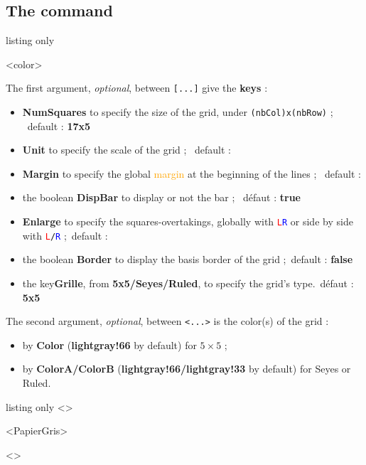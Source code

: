 \documentclass[a4paper]{article}
\newcommand\Cle[1]{{\bfseries\sffamily\textlangle #1\textrangle}}
\begin{document}
\subsection{The command}

\begin{PresentationCode}{listing only}

\DispGrid[keys]<color>
\end{PresentationCode}

The first argument, \textit{optional}, between \texttt{[...]} give the \Cle{keys} :

\begin{itemize}
	\item \Cle{NumSquares} to specify the size of the grid, under \texttt{(nbCol)x(nbRow)} ; \hfill~default : \Cle{17x5}
	\item \Cle{Unit} to specify the scale of the grid ; \hfill~default : \Cle{1}
	\item \Cle{Margin} to specify the global \textcolor{orange}{margin} at the beginning of the lines ; \hfill~default : \Cle{0}
	\item the boolean \Cle{DispBar} to display or not the bar ; \hfill~défaut : \Cle{true}
	\item \Cle{Enlarge} to specify the squares-overtakings, globally with \texttt{\textcolor{red}{L}\textcolor{blue}{R}} or side by side with \texttt{\textcolor{red}{L}/\textcolor{blue}{R}} ;\hfill~default : \Cle{0}
	\item the boolean \Cle{Border} to display the basis border of the grid ;\hfill~default : \Cle{false}
	\item the key\Cle{Grille}, from \Cle{5x5/Seyes/Ruled}, to specify the grid's type.\hfill~défaut : \Cle{5x5}
\end{itemize}

The second argument, \textit{optional}, between \texttt{<...>} is the color(s) of the grid :

\begin{itemize}
	\item by \Cle{Color} (\Cle{lightgray!66} by default) for $5\times5$  ;
	\item by \Cle{ColorA/ColorB} (\Cle{lightgray!66/lightgray!33} by default) for Seyes or Ruled.
\end{itemize}

\medskip

\begin{PresentationCode}{listing only}
\DispGrid[NumSquares=18x4,Grid=Seyes,DispBar=false]<\ColSeyes>

\DispGrid[NumSquares=36x8,Enlarge=3/3]<PapierGris>

\begin{center}
	\DispGrid[NumSquares=12x3,Grid=Ruled,Margin=2]<\ColRuled>
\end{center}
\end{PresentationCode}
\end{document}
